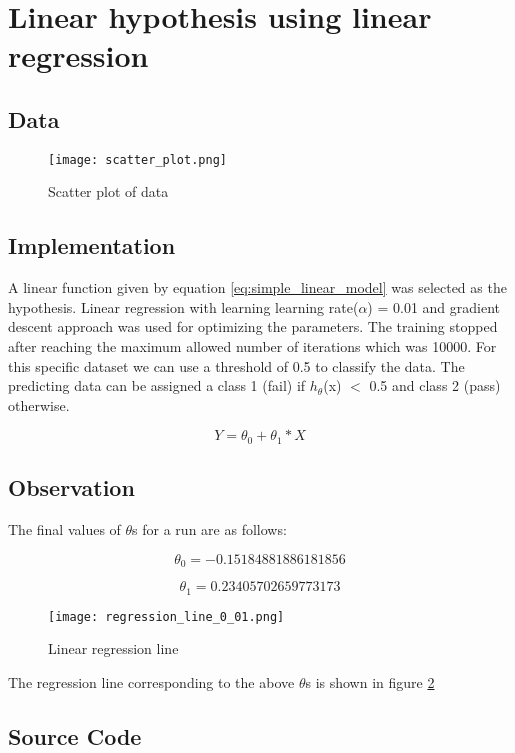 \section{Linear hypothesis using linear regression}

\subsection{Data}
\begin{figure}[!ht]
  \texttt{[image: scatter\_plot.png]}
  \caption{Scatter plot of data}
  \label{fig:scatter_plot}
\end{figure}

\subsection{Implementation}
A linear function given by equation \ref{eq:simple_linear_model} was selected as the hypothesis.
Linear regression with learning learning rate($\alpha$) = 0.01 and gradient descent approach was used for optimizing the parameters.
The training stopped after reaching the maximum allowed number of iterations which was 10000.
For this specific dataset we can use a threshold of 0.5 to classify the data. The predicting data
can be assigned a class 1 (fail) if $h_{\theta}$(x) $<$ 0.5 and class 2 (pass) otherwise.

\begin{equation}
\label{eq:simple_linear_model}
Y = \theta_0 + \theta_1 * X
\end{equation}

\subsection{Observation}
The final values of $\theta$s for a run are as follows:

\begin{equation}
\theta_0 = -0.15184881886181856
\end{equation}

\begin{equation}
\theta_1 = 0.23405702659773173
\end{equation}

\begin{figure}[!ht]
  \texttt{[image: regression\_line\_0\_01.png]}
  \caption{Linear regression line}
  \label{fig:regression_line}
\end{figure}

The regression line corresponding to the above $\theta$s is shown in figure \ref{fig:regression_line}

\subsection{Source Code}

